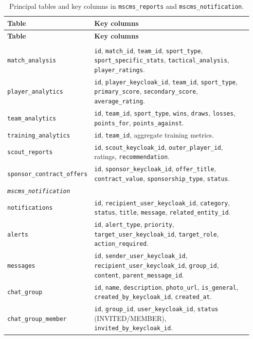 \begin{longtable}{p{} p{}}
\caption{Principal tables and key columns in \texttt{mscms\_reports} and \texttt{mscms\_notification}.}
\label{tab:schema-reports-notif}\\
\toprule
\textbf{Table} & \textbf{Key columns} \\
\midrule
\endfirsthead
\toprule
\textbf{Table} & \textbf{Key columns} \\
\midrule
\endhead
\bottomrule
\endlastfoot
\multicolumn{2}{l}{\textit{\texttt{mscms\_reports}}} \\
\texttt{match\_analysis} & \texttt{id}, \texttt{match\_id}, \texttt{team\_id}, \texttt{sport\_type}, \texttt{sport\_specific\_stats}, \texttt{tactical\_analysis}, \texttt{player\_ratings}. \\
\texttt{player\_analytics} & \texttt{id}, \texttt{player\_keycloak\_id}, \texttt{team\_id}, \texttt{sport\_type}, \texttt{primary\_score}, \texttt{secondary\_score}, \texttt{average\_rating}. \\
\texttt{team\_analytics} & \texttt{id}, \texttt{team\_id}, \texttt{sport\_type}, \texttt{wins}, \texttt{draws}, \texttt{losses}, \texttt{points\_for}, \texttt{points\_against}. \\
\texttt{training\_analytics} & \texttt{id}, \texttt{team\_id}, aggregate training metrics. \\
\texttt{scout\_reports} & \texttt{id}, \texttt{scout\_keycloak\_id}, \texttt{outer\_player\_id}, ratings, \texttt{recommendation}. \\
\texttt{sponsor\_contract\_offers} & \texttt{id}, \texttt{sponsor\_keycloak\_id}, \texttt{offer\_title}, \texttt{contract\_value}, \texttt{sponsorship\_type}, \texttt{status}. \\
\midrule
\multicolumn{2}{l}{\textit{\texttt{mscms\_notification}}} \\
\texttt{notifications} & \texttt{id}, \texttt{recipient\_user\_keycloak\_id}, \texttt{category}, \texttt{status}, \texttt{title}, \texttt{message}, \texttt{related\_entity\_id}. \\
\texttt{alerts} & \texttt{id}, \texttt{alert\_type}, \texttt{priority}, \texttt{target\_user\_keycloak\_id}, \texttt{target\_role}, \texttt{action\_required}. \\
\texttt{messages} & \texttt{id}, \texttt{sender\_user\_keycloak\_id}, \texttt{recipient\_user\_keycloak\_id}, \texttt{group\_id}, \texttt{content}, \texttt{parent\_message\_id}. \\
\texttt{chat\_group} & \texttt{id}, \texttt{name}, \texttt{description}, \texttt{photo\_url}, \texttt{is\_general}, \texttt{created\_by\_keycloak\_id}, \texttt{created\_at}. \\
\texttt{chat\_group\_member} & \texttt{id}, \texttt{group\_id}, \texttt{user\_keycloak\_id}, \texttt{status} (INVITED/MEMBER), \texttt{invited\_by\_keycloak\_id}. \\
\end{longtable}
\renewcommand{\arraystretch}{1.0}

